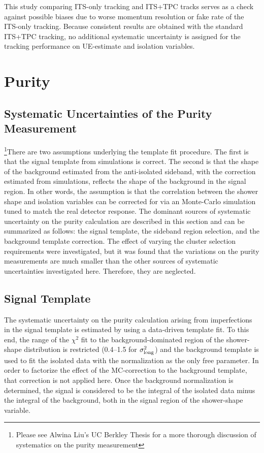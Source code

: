 This study comparing ITS-only tracking and ITS+TPC tracks serves as a check against possible biases due to worse momentum resolution or fake rate of the ITS-only tracking. Because consistent results are obtained with the standard ITS+TPC tracking, no additional systematic uncertainty is assigned for the tracking performance on UE-estimate and isolation variables. 



\section{Purity}
\subsection{Systematic Uncertainties of the Purity Measurement}
\label{sec:puritysystematics}
\footnote{Please see Alwina Liu's UC Berkley Thesis for a more thorough discussion of systematics on the purity measurement}There are two assumptions underlying the template fit procedure. The first is that the signal template from simulations is correct. The second is that the shape of the background estimated from the anti-isolated sideband, with the correction estimated from simulations, reflects the shape of the background in the signal region. In other words, the assumption is that the correlation between the shower shape and isolation variables can be corrected for via an Monte-Carlo simulation tuned to match the real detector response. The dominant sources of systematic uncertainty on the purity calculation are described in this section and can be summarized as follows: the signal template, the sideband region selection, and the background template correction. The effect of varying the cluster selection requirements were investigated, but it was found that the variations on the purity measurements are much smaller than the other sources of systematic uncertainties investigated here. Therefore, they are neglected. 

\subsection{Signal Template}
The systematic uncertainty on the purity calculation arising from imperfections in the signal template is estimated by using a data-driven template fit. To this end, the range of the $\chi^{2}$ fit to the background-dominated region of the shower-shape distribution is restricted (0.4--1.5 for $\sigma^{2}_{\mathrm{long}}$) and the background template is used to fit the isolated data with the normalization as the only free parameter. In order to factorize the effect of the MC-correction to the background template, that correction is not applied here. Once the background normalization is determined, the signal is considered to be the integral of the isolated data minus the integral of the background, both in the signal region of the shower-shape variable. 

